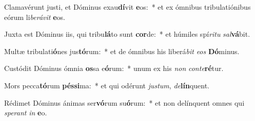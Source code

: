 \item Clamavérunt justi, et Dóminus exau\textbf{dí}vit \textbf{e}os:~* et ex ómnibus tribulatiónibus eórum li\textit{be}\textit{rá}\textit{vit} \textbf{e}os.
\item Juxta est Dóminus iis, qui tribu\textbf{lá}to sunt \textbf{cor}de:~* et húmiles spí\textit{ri}\textit{tu} \textit{sal}\textbf{vá}bit.
\item Multæ tribulati\textbf{ó}nes jus\textbf{tó}rum:~* et de ómnibus his liberá\textit{bit} \textit{e}\textit{os} \textbf{Dó}minus.
\item Custódit Dóminus ómnia \textbf{os}sa e\textbf{ó}rum:~* unum ex his \textit{non} \textit{con}\textit{te}\textbf{ré}tur.
\item Mors pecca\textbf{tó}rum \textbf{pés}\textbf{si}ma:~* et qui odérunt \textit{jus}\textit{tum}, \textit{de}\textbf{lín}quent.
\item Rédimet Dóminus ánimas ser\textbf{vó}rum su\textbf{ó}rum:~* et non delínquent omnes qui \textit{spe}\textit{rant} \textit{in} \textbf{e}o.
